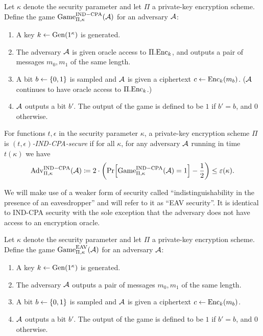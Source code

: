 \begin{definition}
	Let $\kappa$ denote the security parameter and let $\Pi$ a private-key encryption scheme. Define the game $\mathrm{Game}_{\Pi, \kappa}^{\mathrm{IND-CPA}}(\mathcal{A})$ for an adversary $\mathcal{A}$:
	\begin{enumerate}[1.]
		\item A key $k \leftarrow \mathrm{Gen}(1^\kappa)$ is generated.
		\item The adversary $\mathcal{A}$ is given oracle access to $\Pi.\mathrm{Enc}_k$, and outputs a pair of messages $m_0, m_1$ of the same length.
		\item A bit $b \leftarrow \{0, 1\}$ is sampled and $\mathcal{A}$ is given a ciphertext $c \leftarrow \mathrm{Enc}_k(m_b)$. ($\mathcal{A}$ continues to have oracle access to $\Pi.\mathrm{Enc}_k$.)
		\item $\mathcal{A}$ outputs a bit $b'$. The output of the game is defined to be $1$ if $b' = b$, and $0$ otherwise.
	\end{enumerate}
\end{definition}

\begin{definition}
	For functions $t, \epsilon$ in the security parameter $\kappa$, a private-key encryption scheme $\Pi$ is \emph{$(t, \epsilon)$-IND-CPA-secure} if for all $\kappa$, for any adversary $\mathcal{A}$ running in time $t(\kappa)$ we have
	\begin{align*}
		\advantage{\Pi}{\kappa}{IND-CPA}(\adv) \coloneqq 2 \cdot \left(\pr{\game{\Pi}{\kappa}{IND-CPA}(\adv) = 1} - \frac{1}{2}\right) \le \epsilon(\kappa).
	\end{align*}
\end{definition}

We will make use of a weaker form of security called ``indistinguishability in the presence of an eavesdropper'' \cite{introduction-to-modern-cryptography} and will refer to it as ``EAV security''. It is identical to IND-CPA security with the sole exception that the adversary does not have access to an encryption oracle.

\begin{definition}
	Let $\kappa$ denote the security parameter and let $\Pi$ a private-key encryption scheme. Define the game $\mathrm{Game}_{\Pi, \kappa}^{\mathrm{EAV}}(\mathcal{A})$ for an adversary $\mathcal{A}$:
	\begin{enumerate}[1.]
		\item A key $k \leftarrow \mathrm{Gen}(1^\kappa)$ is generated.
		\item The adversary $\mathcal{A}$ outputs a pair of messages $m_0, m_1$ of the same length.
		\item A bit $b \leftarrow \{0, 1\}$ is sampled and $\mathcal{A}$ is given a ciphertext $c \leftarrow \mathrm{Enc}_k(m_b)$.
		\item $\mathcal{A}$ outputs a bit $b'$. The output of the game is defined to be $1$ if $b' = b$, and $0$ otherwise.
	\end{enumerate}
\end{definition}

